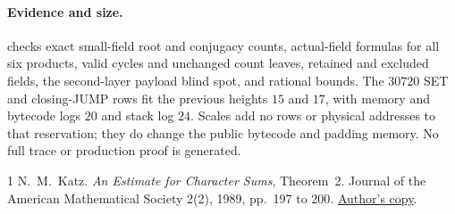 \documentclass[11pt]{article}
\begin{document}
\paragraph{Evidence and size.}  checks exact small-field root and conjugacy counts, actual-field formulas for all six products, valid cycles and unchanged count leaves, retained and excluded fields, the second-layer payload blind spot, and rational bounds. The $30720$ SET and closing-JUMP rows fit the previous heights $15$ and $17$, with memory and bytecode logs $20$ and stack log $24$. Scales add no rows or physical addresses to that reservation; they do change the public bytecode and padding memory. No full trace or production proof is generated.

\begin{thebibliography}{1}
 N.~M.~Katz. \emph{An Estimate for Character Sums}, Theorem~2. Journal of the American Mathematical Society 2(2), 1989, pp.~197 to 200. \href{https://web.math.princeton.edu/~nmk/old/estcharsums.pdf}{Author's copy}.
\end{thebibliography}
\end{document}
